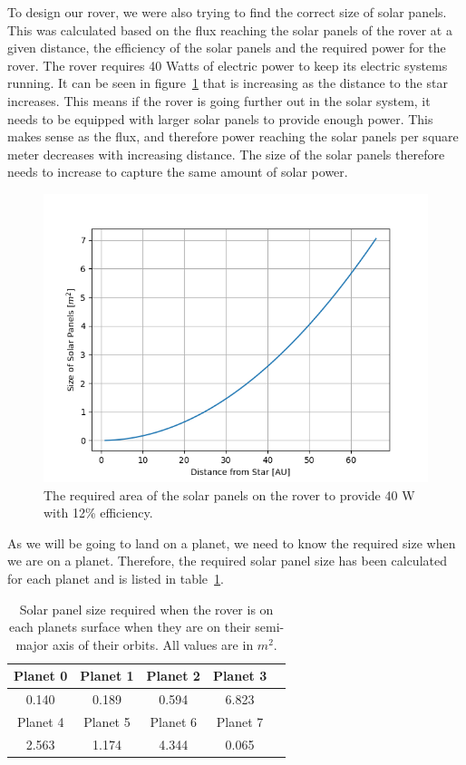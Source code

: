 \documentclass[reprint,english,notitlepage]{revtex4-2}
\begin{document}
	To design our rover, we were also trying to find the correct size of solar panels.
	This was calculated based on the flux reaching the solar panels of the rover at a given distance, the efficiency of the solar panels and the required power for the rover.
	The rover requires 40 Watts of electric power to keep its electric systems running.
	It can be seen in figure~\ref{fig:Radius_area} that is increasing as the distance to the star increases.
	This means if the rover is going further out in the solar system, it needs to be equipped with larger solar panels to provide enough power.
	This makes sense as the flux, and therefore power reaching the solar panels per square meter decreases with increasing distance.
	The size of the solar panels therefore needs to increase to capture the same amount of solar power.

	\begin{figure}[h]
		\centering
		\includegraphics[scale=0.4]{Figures/Radius_area}
		\caption{The required area of the solar panels on the rover to provide 40 W with 12\% efficiency.}\label{fig:Radius_area}
	\end{figure}

	As we will be going to land on a planet, we need to know the required size when we are on a planet.
	Therefore, the required solar panel size has been calculated for each planet and is listed in table~\ref{tab:panel_sizes}.

	\begin{table}[h]
			\begin{tabular}{|c|c|c|c|c|}
				\hline
				Planet 0 & Planet 1 & Planet 2 & Planet 3\\
				\hline
				0.140 & 0.189 & 0.594 & 6.823\\
				\hline\hline
				Planet 4 & Planet 5 & Planet 6 & Planet 7\\
				\hline
				2.563 & 1.174 & 4.344 & 0.065\\
				\hline
			\end{tabular}
			\caption{Solar panel size required when the rover is on each planets surface when they are on their semi-major axis of their orbits. All values are in $m^2$.}
			\label{tab:panel_sizes}
		\end{table}
\end{document}
